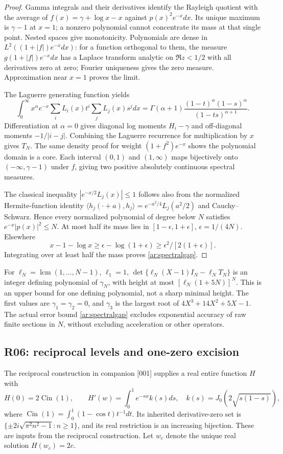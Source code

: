 \documentclass[11pt,a4paper]{article}
\theoremstyle{definition}
\theoremstyle{remark}
\numberwithin{equation}{section}
\begin{document}
\begin{proof}
Gamma integrals and their derivatives identify the Rayleigh quotient with
the average of $f(x)=\gamma+\log x-x$ against $p(x)^2e^{-x}dx$.
Its unique maximum is $\gamma-1$ at $x=1$; a nonzero polynomial cannot
concentrate its mass at that single point.  Nested spaces give monotonicity.
Polynomials are dense in $L^2((1+|f|)e^{-x}dx)$: for a function
orthogonal to them, the measure $g(1+|f|)e^{-x}dx$ has a Laplace transform
analytic on $\Re z<1/2$ with all derivatives zero at zero; Fourier
uniqueness gives the zero measure.  Approximation near $x=1$ proves the
limit.

The Laguerre generating function yields
\[
 \int_0^\infty x^\alpha e^{-x}
 \sum_iL_i(x)t^i\sum_jL_j(x)s^jdx
 =\Gamma(\alpha+1)
 \frac{(1-t)^\alpha(1-s)^\alpha}{(1-ts)^{\alpha+1}}.
\]
Differentiation at $\alpha=0$ gives diagonal log moments $H_i-\gamma$
and off-diagonal moments $-1/|i-j|$.  Combining the Laguerre recurrence
for multiplication by $x$ gives $T_N$.  The same density proof for weight
$(1+f^2)e^{-x}$ shows the polynomial domain is a core.  Each interval
$(0,1)$ and $(1,\infty)$ maps bijectively onto $(-\infty,\gamma-1)$
under $f$, giving two positive absolutely continuous spectral measures.

The classical inequality $|e^{-x/2}L_j(x)|\le1$
\cite{ar:DLMFLaguerre} follows also from the normalized Hermite-function
identity $\langle h_j(\cdot+a),h_j\rangle=e^{-a^2/4}L_j(a^2/2)$ and
Cauchy--Schwarz.  Hence every normalized polynomial of degree below $N$
satisfies $e^{-x}|p(x)|^2\le N$.  At most half its mass lies in
$[1-\epsilon,1+\epsilon]$, $\epsilon=1/(4N)$.  Elsewhere
\[
 x-1-\log x\ge\epsilon-\log(1+\epsilon)
 \ge\epsilon^2/[2(1+\epsilon)].
\]
Integrating over at least half the mass proves \eqref{ar:spectralgap}.
\end{proof}
For $\ell_N=\operatorname{lcm}(1,\ldots,N-1)$, $\ell_1=1$,
$\det\{\ell_N(X-1)I_N-\ell_NT_N\}$ is an integer defining polynomial
of $\gamma_N$, with height at most $[\ell_N(1+5N)]^N$.
This is an upper bound for one defining polynomial, not a sharp minimal
height.  The first values are $\gamma_1=\gamma_2=0$, and $\gamma_3$ is
the largest root of $4X^3+14X^2+5X-1$.
The actual error bound \eqref{ar:spectralgap} excludes exponential
accuracy of raw finite sections in $N$, without excluding acceleration
or other operators.

\subsection{R06: reciprocal levels and one-zero excision}
The reciprocal construction in companion [001] supplies a real entire
function $H$ with
\[
 H(0)=2\operatorname{Cin}(1),\qquad
 H'(w)=\int_0^1e^{-sw}k(s)ds,\quad
 k(s)=J_0(2\sqrt{s(1-s)}),
\]
where $\operatorname{Cin}(1)=\int_0^1(1-\cos t)t^{-1}dt$.
Its inherited derivative-zero set is
$\{\pm2i\sqrt{\pi^2n^2-1}:n\ge1\}$, and its real restriction is an
increasing bijection.  These are inputs from the reciprocal construction.
Let $w_c$ denote the unique real solution $H(w_c)=2c$.
\end{document}
